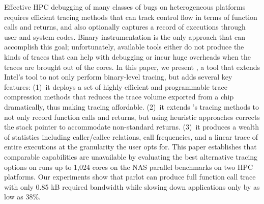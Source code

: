Effective HPC debugging of many classes of bugs on heterogeneous
platforms requires efficient tracing methods that can track control
flow in terms of function calls and returns, and also optionally
captures a record of executions through user and system codes.
%
Binary instrumentation is the only approach that can accomplish this
goal; unfortunately, available tools either do not produce the kinds
of traces that can help with debugging or incur huge overheads when
the traces are brought out of the cores.
%
In this paper, we present \parlot,  a tool that extends Intel's \pin
tool to not only perform binary-level tracing, but adds several  key
features: (1)~it deploys a set of highly efficient and programmable
trace compression methods that reduces the trace volume exported 
from a chip dramatically, thus making tracing affordable.
(2)~it extends \pin's tracing methods to not only record function
calls and returns, but using heuristic approaches corrects the
stack pointer to accommodate non-standard returns.
(3)~it produces a wealth of statistics including caller/callee
relations, call frequencies, and a linear trace of entire executions
at the granularity the user opts for.
%
This paper establishes that comparable capabilities are 
unavailable by evaluating the best alternative tracing options
on runs up to 1,024 cores on the NAS parallel benchmarks on 
two HPC platforms.
%
Our experiments show that parlot can produce full function call trace with only 0.85 kB required bandwidth while slowing down applications only by as low as 38\%. %
%
